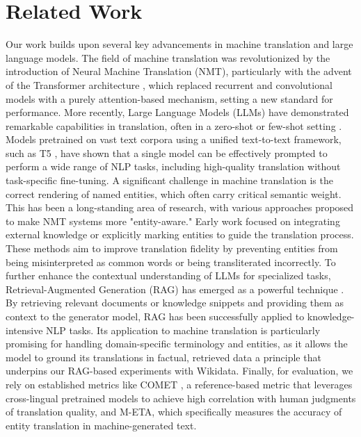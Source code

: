 \documentclass[final]{ecai}
\begin{document}
\section{Related Work}
\label{sec:related}
Our work builds upon several key advancements in machine translation and large language models. 
The field of machine translation was revolutionized by the introduction of Neural Machine Translation (NMT), 
particularly with the advent of the Transformer architecture \cite{vaswani2017attention}, 
which replaced recurrent and convolutional models with a purely attention-based mechanism, 
setting a new standard for performance.
More recently, Large Language Models (LLMs) have demonstrated remarkable capabilities in translation, 
often in a zero-shot or few-shot setting \cite{brown2020language}. 
Models pretrained on vast text corpora using a unified text-to-text framework, 
such as T5 \cite{raffel2020exploring}, have shown that a single model can be effectively prompted 
to perform a wide range of NLP tasks, including high-quality translation without task-specific fine-tuning.
A significant challenge in machine translation is the correct rendering of named entities,
which often carry critical semantic weight. This has been a long-standing area of research, 
with various approaches proposed to make NMT systems more "entity-aware." 
Early work focused on integrating external knowledge or explicitly marking entities to guide the translation process. 
These methods aim to improve translation fidelity by preventing entities from being misinterpreted 
as common words or being transliterated incorrectly.
To further enhance the contextual understanding of LLMs for specialized tasks, 
Retrieval-Augmented Generation (RAG) has emerged as a powerful technique \cite{lewis2020retrieval}. 
By retrieving relevant documents or knowledge snippets and providing them as context to the generator model, 
RAG has been successfully applied to knowledge-intensive NLP tasks. Its application to machine translation is 
particularly promising for handling domain-specific terminology and entities, 
as it allows the model to ground its translations in factual, retrieved data
a principle that underpins our RAG-based experiments with Wikidata. 
Finally, for evaluation, we rely on established metrics like COMET \cite{rei-etal-2020-comet}, 
a reference-based metric that leverages cross-lingual pretrained models to achieve high correlation
with human judgments of translation quality, and M-ETA,
which specifically measures the accuracy of entity translation in machine-generated text.
\end{document}
